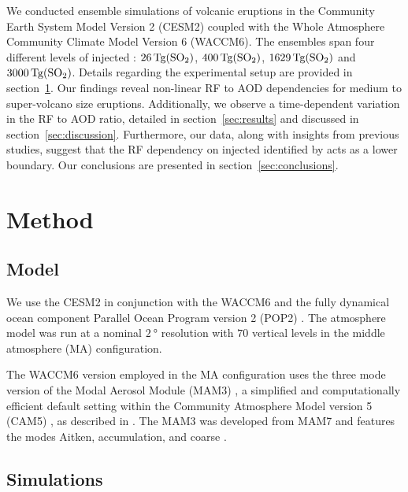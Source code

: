 \documentclass[draft]{agujournal2019}
\begin{document}
  We conducted ensemble simulations of volcanic eruptions in the Community Earth System
  Model Version 2 (CESM2) coupled with the Whole Atmosphere Community Climate Model
  Version 6 (WACCM6). The ensembles span four different levels of injected :
  \(\SI{26}{\tera\gram(\ce{SO2})}\), \(\SI{400}{\tera\gram(\ce{SO2})}\),
  \(\SI{1629}{\tera\gram(\ce{SO2})}\) and \(\SI{3000}{\tera\gram(\ce{SO2})}\). Details
  regarding the experimental setup are provided in section~\ref{sec:method}. Our
  findings reveal non-linear RF to AOD dependencies for medium to super-volcano size
  eruptions. Additionally, we observe a time-dependent variation in the RF to AOD ratio,
  detailed in section~\ref{sec:results} and discussed in section~\ref{sec:discussion}.
  Furthermore, our data, along with insights from previous studies, suggest that the RF
  dependency on injected  identified by  acts as a lower
  boundary. Our conclusions are presented in section~\ref{sec:conclusions}.

  \section{Method}

  \label{sec:method}

  \subsection{Model}

  We use the CESM2 \cite{danabasoglu2020} in conjunction with the WACCM6
  \cite{gettleman2019} and the fully dynamical ocean component Parallel Ocean Program
  version 2 (POP2) \cite{smith2010, danabasoglu2020}. The atmosphere model was run at a
  nominal \(\SI{2}{\degree}\) resolution with \(70\) vertical levels in the middle
  atmosphere (MA) configuration.

  The WACCM6 version employed in the MA configuration uses the three mode version of the
  Modal Aerosol Module (MAM3) \cite{gettleman2019}, a simplified and computationally
  efficient default setting within the Community Atmosphere Model version 5 (CAM5)
  \cite{liu2016}, as described in . The MAM3 was developed from MAM7 and
  features the modes Aitken, accumulation, and coarse \cite{liu2016}.

  \subsection{Simulations}
\end{document}
